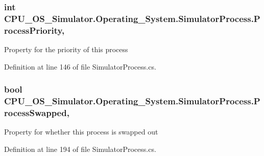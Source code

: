 \subsubsection[{Process\+Priority}]{\setlength{\rightskip}{0pt plus 5cm}int C\+P\+U\+\_\+\+O\+S\+\_\+\+Simulator.\+Operating\+\_\+\+System.\+Simulator\+Process.\+Process\+Priority\hspace{0.3cm}{\ttfamily [get]}, {\ttfamily [set]}}\label{class_c_p_u___o_s___simulator_1_1_operating___system_1_1_simulator_process_a5f5199c59eeb6696cdff475a3d752b8a}




Property for the priority of this process 

Definition at line 146 of file Simulator\+Process.\+cs.

\hypertarget{class_c_p_u___o_s___simulator_1_1_operating___system_1_1_simulator_process_a7886e0890797887fcdd65b6eac62cfc0}{}
\subsubsection[{Process\+Swapped}]{\setlength{\rightskip}{0pt plus 5cm}bool C\+P\+U\+\_\+\+O\+S\+\_\+\+Simulator.\+Operating\+\_\+\+System.\+Simulator\+Process.\+Process\+Swapped\hspace{0.3cm}{\ttfamily [get]}, {\ttfamily [set]}}\label{class_c_p_u___o_s___simulator_1_1_operating___system_1_1_simulator_process_a7886e0890797887fcdd65b6eac62cfc0}


Property for whether this process is swapped out 



Definition at line 194 of file Simulator\+Process.\+cs.

\hypertarget{class_c_p_u___o_s___simulator_1_1_operating___system_1_1_simulator_process_a594fe15fec1c942ccfbcfa9c345624ee}{}

